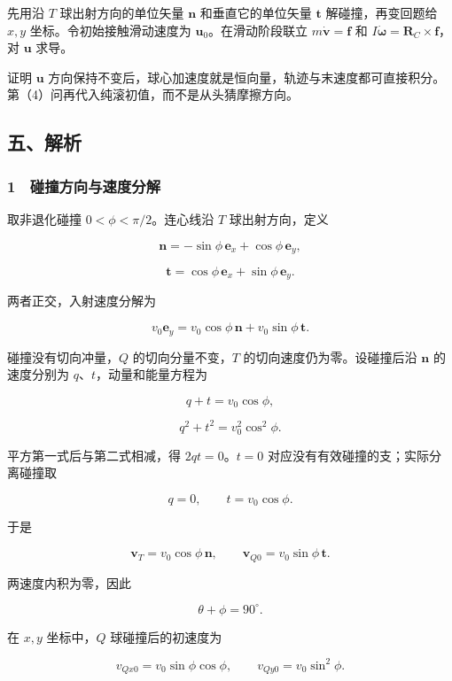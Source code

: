 \documentclass[12pt,a4paper,fontset=fandol]{ctexart}
\begin{document}
先用沿 \(T\) 球出射方向的单位矢量 \(\boldsymbol n\) 和垂直它的单位矢量
\(\boldsymbol t\) 解碰撞，再变回题给 \(x,y\) 坐标。令初始接触滑动速度为
\(\boldsymbol u_0\)。在滑动阶段联立
\(m\dot{\boldsymbol v}=\boldsymbol f\) 和
\(I\dot{\boldsymbol\omega}=\boldsymbol R_C\times\boldsymbol f\)，对
\(\boldsymbol u\) 求导。

证明 \(\boldsymbol u\)
方向保持不变后，球心加速度就是恒向量，轨迹与末速度都可直接积分。第（4）问再代入纯滚初值，而不是从头猜摩擦方向。

\subsection{五、解析}\label{ux4e94ux89e3ux6790-1}

\subsubsection{1　碰撞方向与速度分解}\label{ux78b0ux649eux65b9ux5411ux4e0eux901fux5ea6ux5206ux89e3}

取非退化碰撞 \(0<\phi<\pi/2\)。连心线沿 \(T\) 球出射方向，定义

\[\boldsymbol n=-\sin\phi\,\boldsymbol e_x+\cos\phi\,\boldsymbol e_y,\]

\[\boldsymbol t=\cos\phi\,\boldsymbol e_x+\sin\phi\,\boldsymbol e_y.\]

两者正交，入射速度分解为

\[v_0\boldsymbol e_y
=v_0\cos\phi\,\boldsymbol n+v_0\sin\phi\,\boldsymbol t.\]

碰撞没有切向冲量，\(Q\) 的切向分量不变，\(T\)
的切向速度仍为零。设碰撞后沿 \(\boldsymbol n\) 的速度分别为
\(q\)、\(t\)，动量和能量方程为

\[q+t=v_0\cos\phi,\]

\[q^2+t^2=v_0^2\cos^2\phi.\]

平方第一式后与第二式相减，得 \(2qt=0\)。\(t=0\)
对应没有有效碰撞的支；实际分离碰撞取

\[q=0,\qquad t=v_0\cos\phi.\]

于是

\[\boxed{\boldsymbol v_{T}=v_0\cos\phi\,\boldsymbol n,
\qquad\boldsymbol v_{Q0}=v_0\sin\phi\,\boldsymbol t.}\]

两速度内积为零，因此

\[\boxed{\theta+\phi=90^\circ.}\]

在 \(x,y\) 坐标中，\(Q\) 球碰撞后的初速度为

\[\boxed{v_{Qx0}=v_0\sin\phi\cos\phi,
\qquad v_{Qy0}=v_0\sin^2\phi.}\]
\end{document}
